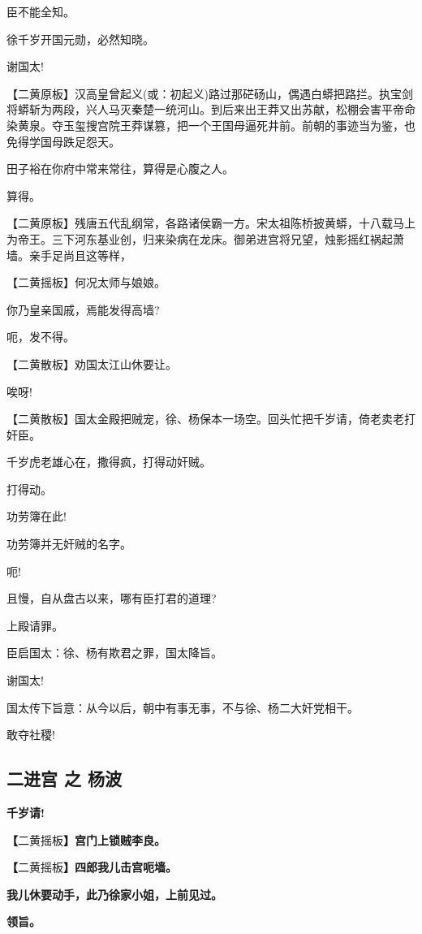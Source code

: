 臣不能全知。

徐千岁开国元勋，必然知晓。

谢国太!

【二黄原板】汉高皇曾起义(或：初起义)路过那硭砀山，偶遇白蟒把路拦。执宝剑将蟒斩为两段，兴人马灭秦楚一统河山。到后来出王莽又出苏献，松棚会害平帝命染黄泉。夺玉玺搜宫院王莽谋篡，把一个王国母逼死井前。前朝的事迹当为鉴，也免得学国母跌足怨天。

田子裕在你府中常来常往，算得是心腹之人。

算得。

【二黄原板】残唐五代乱纲常，各路诸侯霸一方。宋太祖陈桥披黄蟒，十八载马上为帝王。三下河东基业创，归来染病在龙床。御弟进宫将兄望，烛影摇红祸起萧墙。亲手足尚且这等样，

【二黄摇板】何况太师与娘娘。

你乃皇亲国戚，焉能发得高墙?

呃，发不得。

【二黄散板】劝国太江山休要让。

唉呀!

【二黄散板】国太金殿把贼宠，徐、杨保本一场空。回头忙把千岁请，倚老卖老打奸臣。

千岁虎老雄心在，撒得疯，打得动奸贼。

打得动。

功劳簿在此!

功劳簿并无奸贼的名字。

呃!

且慢，自从盘古以来，哪有臣打君的道理?

上殿请罪。

臣启国太：徐、杨有欺君之罪，国太降旨。

谢国太!

国太传下旨意：从今以后，朝中有事无事，不与徐、杨二大奸党相干。

敢夺社稷!

\hypertarget{ux4e8cux8fdbux5bab-ux4e4b-ux6768ux6ce2}{%
\subsection{二进宫 之
杨波}\label{ux4e8cux8fdbux5bab-ux4e4b-ux6768ux6ce2}}

\textbf{千岁请!}

\textbf{【}二黄摇板\textbf{】宫门上锁贼李良。}

\textbf{【}二黄摇板\textbf{】四郎我儿击宫呃墙。}

\textbf{我儿休要动手，此乃徐家小姐，上前见过。}

\textbf{领旨。}

